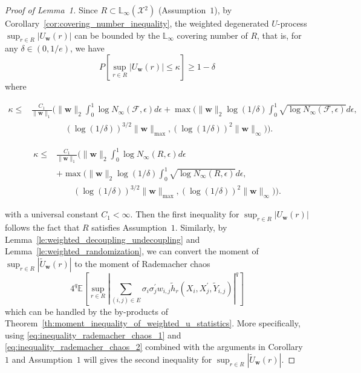\documentclass[letterpaper]{article} %
\def\DoubleColumn{}
\def\DoubleColumnEnd{}
\def\SingleColumn{}
\def\SingleColumnEnd{}
\newcommand{\E}{\mathbb{E}}
\newcommand{\Pro}{P}
\newcommand{\weight}{\mathbf{w}}
\newcommand{\xspace}{\mathcal{X}}
\newcommand{\pair}[1]{(#1)}
\newcommand{\lebesgue}{\mathbb{L}}
\newcommand{\normo}[1]{\|#1\|_1}
\begin{document}
\begin{proof}[Proof of Lemma~1] %
Since $R\subset\lebesgue{}_\infty(\xspace{}^2)$ (Assumption~$1$), by Corollary~\ref{cor:covering_number_inequality}, the weighted degenerated $U$-process $\sup_{r\in R}|U_\weight{}(r)|$ can be bounded by the $\lebesgue{}_\infty$ covering number of $R$, that is, for any $\delta\in (0,1/e)$, we have
\[\Pro[\sup_{r\in R}|U_\weight{}(r)|\le \kappa]\ge 1-\delta\]
where 
\SingleColumn
\begin{align*}
    \kappa\le&\frac{C_1}{\normo{\weight}}\Bigg(\|\weight{}\|_2\int_0^{1}\log N_\infty(\mathcal F, \epsilon)d\epsilon+\max\Big(\|\weight{}\|_2\log(1/\delta)\int_0^{1}\sqrt{\log N_\infty(\mathcal F,\epsilon)}d\epsilon,\\
    &\qquad\qquad(\log(1/\delta))^{3/2}\|\weight{}\|_{\max}, (\log(1/\delta))^2\|\weight{}\|_\infty\Big)\Bigg).
\end{align*}
\SingleColumnEnd
\DoubleColumn
\begin{align*}
    \kappa\le&\frac{C_1}{\normo{\weight}}\Bigg(\|\weight{}\|_2\int_0^{1}\log N_\infty(R, \epsilon)d\epsilon\\
    &+\max\Big(\|\weight{}\|_2\log(1/\delta)\int_0^{1}\sqrt{\log N_\infty(R,\epsilon)}d\epsilon,\\
    &\qquad(\log(1/\delta))^{3/2}\|\weight{}\|_{\max},(\log(1/\delta))^2\|\weight{}\|_\infty\Big)\Bigg).
\end{align*}
\DoubleColumnEnd
with a universal constant $C_1<\infty$. 
Then the first inequality for $\sup_{r\in R}|U_\weight{}(r)|$ follows the fact that $R$ satisfies Assumption~$1$.
Similarly, by Lemma~\ref{le:weighted_decoupling_undecoupling} and Lemma~\ref{le:weighted_randomization}, we can convert the moment of $\sup_{r\in R}|\widetilde{U}_\weight{}(r)|$ to the moment of Rademacher chaos
\[4^q\E[\sup_{r\in R}|\sum_{\pair{i,j}\in E}\sigma_i\sigma_j^\prime w_{i,j}\tilde{h}_r(X_i, X_j^\prime,\tilde{Y}_{i,j})|^q]\] 
which can be handled by the by-products of Theorem~\ref{th:moment_inequality_of_weighted_u_statistics}. More specifically, using \eqref{eq:inequality_rademacher_chaos_1} and \eqref{eq:inequality_rademacher_chaos_2} combined with the arguments in Corollary~$1$ and Assumption~$1$ will gives the second inequality for $\sup_{r\in R}|\widetilde{U}_\weight{}(r)|$.
\end{proof}

\end{document}
